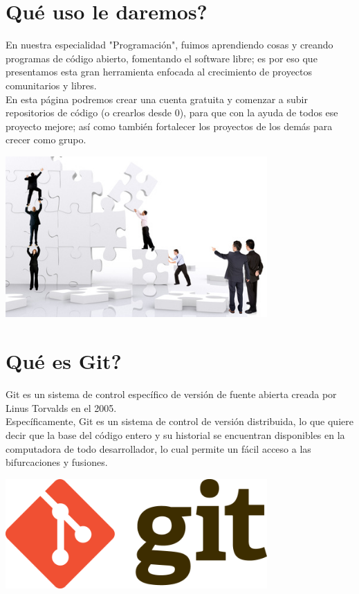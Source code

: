 \section{Qué uso le daremos?}
\begin{itemize}
En nuestra especialidad "Programación", fuimos aprendiendo cosas y creando programas de código abierto, fomentando el software libre; es por eso que presentamos esta gran herramienta enfocada al crecimiento de proyectos comunitarios y libres.\\
En esta página podremos crear una cuenta gratuita y comenzar a subir repositorios de código (o crearlos desde 0), para que con la ayuda de todos ese proyecto mejore; así como también fortalecer los proyectos de los demás para crecer como grupo.
\end{itemize}

\begin{center}
\includegraphics[width=10cm]{./Imagenes/proyecto} 
\end{center}

\section{Qué es Git?}
\begin{itemize}
Git es un sistema de control específico de versión de fuente abierta creada por Linus Torvalds en el 2005.\\
Específicamente, Git es un sistema de control de versión distribuida, lo que quiere decir que la base del código entero y su historial se encuentran disponibles en la computadora de todo desarrollador, lo cual permite un fácil acceso a las bifurcaciones y fusiones.
\end{itemize} 

\begin{center}
\includegraphics[width=10cm]{./Imagenes/git} 
\end{center}

